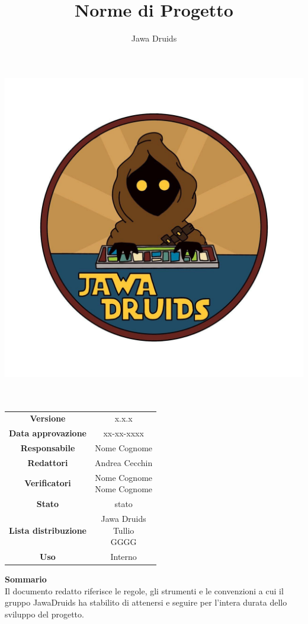 \documentclass[a4paper,12pt]{report}
\begin{document}
	\makeatletter
	\begin{titlepage}
		\begin{center}
			\vspace*{-4,0cm}
			\author{Jawa Druids}
			\title{Norme di Progetto}
			\date{}
			\includegraphics[width=0.7\linewidth]{../immagini/DRUIDSLOGO.jpg}\\[4ex]
			{\huge \bfseries  \@title }\\[2ex] 
			{\LARGE  \@author}\\[50ex]
			\vspace*{-8,0cm}
			\begin{table}[H]
				\centering
				\begin{tabular}{c|c}
					\textbf{Versione} & x.x.x \\
					\textbf{Data approvazione} & xx-xx-xxxx\\
					\textbf{Responsabile} & Nome Cognome\\
					\textbf{Redattori} & Andrea Cecchin \\
					\textbf{Verificatori} & \makecell{Nome Cognome \\ Nome Cognome} \\
					\textbf{Stato} & stato\\
					\textbf{Lista distribuzione} & \makecell{Jawa Druids \\ Tullio \\ GGGG}\\
					\textbf{Uso} & Interno			
				\end{tabular}
			\end{table}
			\fontsize{17}{12}\textbf{Sommario} \\
			Il documento redatto riferisce le regole, gli strumenti e le convenzioni a cui il gruppo JawaDruids ha stabilito di attenersi e seguire per l'intera durata dello sviluppo del progetto.
		\end{center}
	\end{titlepage}
	\makeatother
	
	
	
	\tableofcontents{}
	
	
	
	
	
\end{document}
